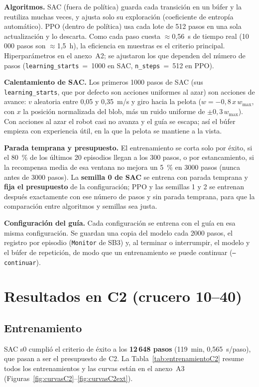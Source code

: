 \documentclass[11pt,a4paper]{article}
\newcommand{\cod}[1]{\texttt{\small #1}}
\begin{document}
\textbf{Algoritmos.} SAC (fuera de política) guarda cada transición en un búfer y la reutiliza muchas veces, y
ajusta solo su exploración (coeficiente de entropía automático). PPO (dentro de política) usa cada lote de 512
pasos en una sola actualización y lo descarta. Como cada paso cuesta $\approx$0,56~s de tiempo real (10\,000
pasos son $\approx$1,5~h), la eficiencia en muestras es el criterio principal. Hiperparámetros en el
anexo~A2; se ajustaron los que dependen del número de pasos (\cod{learning\_starts}~=~1000 en SAC,
\cod{n\_steps}~=~512 en PPO).

\textbf{Calentamiento de SAC.} Los primeros 1000 pasos de SAC (sus \cod{learning\_starts}, que por defecto son
acciones uniformes al azar) son acciones de avance: $v$ aleatoria entre 0,05 y 0,35~m/s y giro hacia la pelota
($w=-0{,}8\,x\,w_{\max}$, con $x$ la posición normalizada del blob, más un ruido uniforme de $\pm0{,}3\,w_{\max}$). Con acciones al azar el robot casi no avanza y el guía se
escapa; así el búfer empieza con experiencia útil, en la que la pelota se mantiene a la vista.

\textbf{Parada temprana y presupuesto.} El entrenamiento se corta solo por éxito, si el 80~\% de los últimos 20
episodios llegan a los 300 pasos, o por estancamiento, si la recompensa media de esa ventana no mejora un 5~\% en
3000 pasos (nunca antes de 3000 pasos). La \textbf{semilla 0 de SAC} se entrena con parada temprana y
\textbf{fija el presupuesto} de la configuración; PPO y las semillas 1 y 2 se entrenan después exactamente con
ese número de pasos y sin parada temprana, para que la comparación entre algoritmos y semillas sea justa.

\textbf{Configuración del guía.} Cada configuración se entrena con el guía en esa misma configuración. Se
guardan una copia del modelo cada 2000 pasos, el registro por episodio (\cod{Monitor} de SB3) y, al terminar o
interrumpir, el modelo y el búfer de repetición, de modo que un entrenamiento se puede continuar
(\cod{--continuar}).

\section{Resultados en C2 (crucero 10--40)}

\subsection{Entrenamiento}
SAC s0 cumplió el criterio de éxito a los \textbf{12\,648 pasos} (119~min, 0,565~s/paso), que pasan a ser el
presupuesto de C2. La Tabla~\ref{tab:entrenamientoC2} resume todos los entrenamientos y las curvas están en el
anexo~A3 (Figuras~\ref{fig:curvasC2}--\ref{fig:curvasC2ext}).
\end{document}
